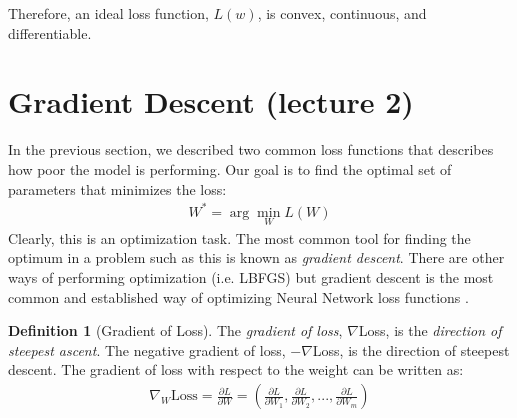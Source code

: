 \documentclass[11pt]{article}
\numberwithin{equation}{section}
\theoremstyle{definition}%
\newtheorem{definition}{Definition}[section]%
\begin{document}
Therefore, an ideal loss function, $L(w)$, is convex, continuous, and differentiable.

\section{Gradient Descent (lecture 2)}


In the previous section, we described two common loss functions that describes how poor the model is performing. Our goal is to find the optimal set of parameters that minimizes the loss:
\begin{align}%
    W^{\ast} = \arg \min_{W} L(W)
\end{align}%
Clearly, this is an optimization task. The most common tool for finding the optimum in a problem such as this is known as \emph{gradient descent}. There are other ways of performing optimization (i.e. LBFGS) but gradient descent is the most common and established way of optimizing Neural Network loss functions \cite{Stanford}.

\begin{definition}[Gradient of Loss]
    The \emph{gradient of loss}, $\nabla$Loss, is the \emph{direction of steepest ascent}. The negative gradient of loss, $-\nabla$Loss, is the direction of steepest descent. The gradient of loss with respect to the weight can be written as:
    \begin{align}
        \nabla_W \text{Loss} = \frac{\partial L}{\partial W} = \left( \frac{\partial L}{\partial W_1}, \frac{\partial L}{\partial W_2}, ..., \frac{\partial L}{\partial W_m} \right)
    \end{align}
\end{definition}
\end{document}
